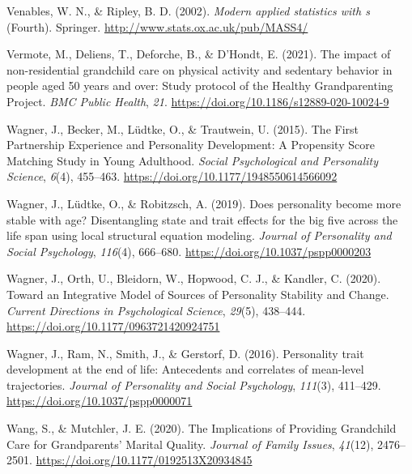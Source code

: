 \documentclass[
  english,
  man,floatsintext]{apa7}
\begin{document}
\leavevmode\hypertarget{ref-R-MASS}{}%
Venables, W. N., \& Ripley, B. D. (2002). \emph{Modern applied statistics with s} (Fourth). Springer. \url{http://www.stats.ox.ac.uk/pub/MASS4/}

\leavevmode\hypertarget{ref-vermoteImpactNonresidentialGrandchild2021a}{}%
Vermote, M., Deliens, T., Deforche, B., \& D'Hondt, E. (2021). The impact of non-residential grandchild care on physical activity and sedentary behavior in people aged 50 years and over: Study protocol of the Healthy Grandparenting Project. \emph{BMC Public Health}, \emph{21}. \url{https://doi.org/10.1186/s12889-020-10024-9}

\leavevmode\hypertarget{ref-wagnerFirstPartnershipExperience2015}{}%
Wagner, J., Becker, M., Lüdtke, O., \& Trautwein, U. (2015). The First Partnership Experience and Personality Development: A Propensity Score Matching Study in Young Adulthood. \emph{Social Psychological and Personality Science}, \emph{6}(4), 455--463. \url{https://doi.org/10.1177/1948550614566092}

\leavevmode\hypertarget{ref-wagnerDoesPersonalityBecome2019}{}%
Wagner, J., Lüdtke, O., \& Robitzsch, A. (2019). Does personality become more stable with age? Disentangling state and trait effects for the big five across the life span using local structural equation modeling. \emph{Journal of Personality and Social Psychology}, \emph{116}(4), 666--680. \url{https://doi.org/10.1037/pspp0000203}

\leavevmode\hypertarget{ref-wagnerIntegrativeModelSources2020}{}%
Wagner, J., Orth, U., Bleidorn, W., Hopwood, C. J., \& Kandler, C. (2020). Toward an Integrative Model of Sources of Personality Stability and Change. \emph{Current Directions in Psychological Science}, \emph{29}(5), 438--444. \url{https://doi.org/10.1177/0963721420924751}

\leavevmode\hypertarget{ref-wagnerPersonalityTraitDevelopment2016}{}%
Wagner, J., Ram, N., Smith, J., \& Gerstorf, D. (2016). Personality trait development at the end of life: Antecedents and correlates of mean-level trajectories. \emph{Journal of Personality and Social Psychology}, \emph{111}(3), 411--429. \url{https://doi.org/10.1037/pspp0000071}

\leavevmode\hypertarget{ref-wangImplicationsProvidingGrandchild2020}{}%
Wang, S., \& Mutchler, J. E. (2020). The Implications of Providing Grandchild Care for Grandparents' Marital Quality. \emph{Journal of Family Issues}, \emph{41}(12), 2476--2501. \url{https://doi.org/10.1177/0192513X20934845}
\end{document}
